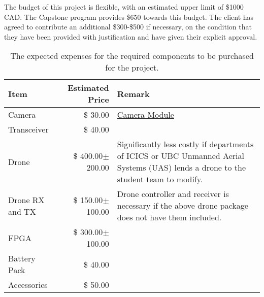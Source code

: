 The budget of this project is flexible, with an estimated upper limit of \$1000 CAD. The Capstone program provides \$650 towards this budget. The client has agreed to contribute an additional \$300-\$500 if necessary, on the condition that they have been provided with justification and have given their explicit approval.

\begin{table}[H]
    \centering
    \caption{The expected expenses for the required components to be purchased for the project.}
    \label{table:budget-items}

    \begin{tabular}{lrp{9cm}}

    \hline
    \textbf{Item} & \textbf{Estimated Price} & \textbf{Remark}\\
    \hline
    Camera&\$ \hfill30.00&\href{https://www.amazon.ca/Raspberry-Pi-Camera-Module-Megapixel/dp/B01ER2SKFS/ref=sr_1_3?crid=OOVX563QBZOF&keywords=raspberry+pi+camera&qid=1570511628&sprefix=raspbe\%2Caps\%2C238&sr=8-3}{Camera Module}\\
    Transceiver&\$ \hfill40.00&\\
    Drone&\$ \hfill400.00$\pm$200.00& Significantly less costly if departments of ICICS or UBC Unmanned Aerial Systems (UAS) lends a drone to the student team to modify.\\
    Drone RX and TX & \$ \hfill 150.00$\pm$100.00 & Drone controller and receiver is necessary if the above drone package does not have them included.\\
    FPGA&\$ \hfill 300.00$\pm$100.00&\\
    Battery Pack&\$ \hfill40.00&\\
    Accessories&\$ \hfill50.00&\\
    \hline

    \end{tabular} 
\end{table}
